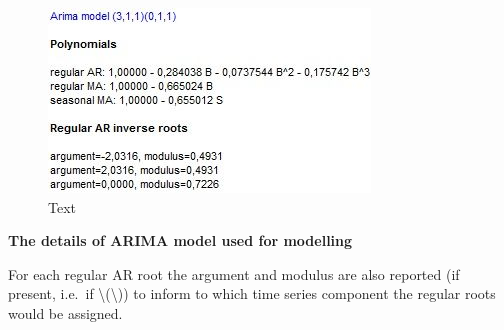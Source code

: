 \documentclass[
  letterpaper,
  DIV=11,
  numbers=noendperiod]{scrreprt}
\begin{document}
\begin{figure}

{\centering \includegraphics{./All_images/RM_C_pic03.jpg}

}

\caption{Text}

\end{figure}

\textbf{The details of ARIMA model used for modelling}

For each regular AR root the argument and modulus are also reported (if
present, i.e.~if \textbackslash(\textbackslash)) to inform
to which time series component the regular roots would be assigned.
\end{document}
